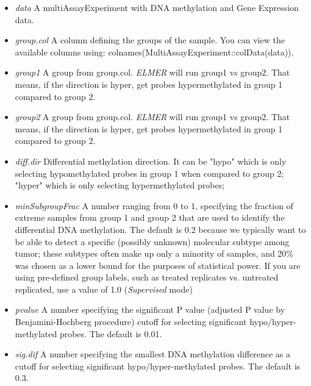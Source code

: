 \begin{itemize}
\item \textit{data} A multiAssayExperiment with DNA methylation and Gene Expression data.
\item  \textit{group.col}	A column defining the groups of the sample. You can view the available columns using: colnames(MultiAssayExperiment::colData(data)).
\item  \textit{group1}	A group from group.col. \textit{ELMER} will run group1 vs group2. That means, if the direction is hyper, get probes hypermethylated in group 1 compared to group 2.
\item  \textit{group2}	A group from group.col. \textit{ELMER} will run group1 vs group2. That means, if the direction is hyper, get probes hypermethylated in group 1 compared to group 2.
\item \textit{diff.dir} Differential methylation direction. It can be "hypo" which is only selecting hypomethylated probes in group 1 when compared to group 2; "hyper" which is only selecting hypermethylated probes;
\item  \textit{minSubgroupFrac} A number ranging from 0 to 1, specifying the fraction of extreme samples from group 1 and group 2 that are used to identify the differential DNA methylation. The default is 0.2 because we typically want to be able to detect a specific (possibly unknown) molecular subtype among tumor; these subtypes often make up only a minority of samples, and 20\% was chosen as a lower bound for the purposes of statistical power. If you are using pre-defined group labels, such as treated replicates vs. untreated replicated, use a value of 1.0 (\textit{Supervised} mode)

\item  \textit{pvalue} A number specifying the significant P value (adjusted P value by Benjamini-Hochberg procedure) cutoff for selecting significant hypo/hyper-methylated probes. The default is 0.01.
\item  \textit{sig.dif} A number specifying the smallest DNA methylation difference as a cutoff for selecting significant hypo/hyper-methylated probes. The default is 0.3.
\end{itemize}



